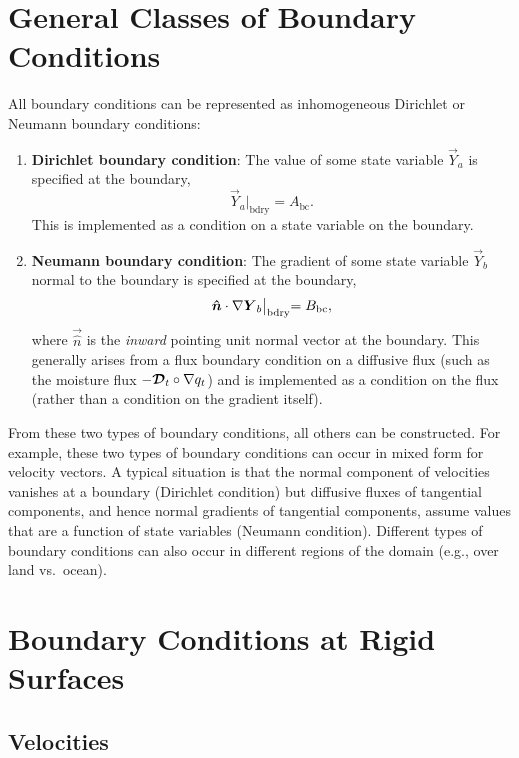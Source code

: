 \documentclass{report}
\begin{document}
\section{General Classes of Boundary Conditions}

All boundary conditions can be represented as inhomogeneous Dirichlet or Neumann boundary conditions:
\begin{enumerate}
    \item \textbf{Dirichlet boundary condition}: The value of some state variable $\vec{Y}_a$ is specified at the boundary,
    \[
    \vec{Y}_a\bigl|_\mathrm{bdry} = A_\mathrm{bc}.
    \]
    This is implemented as a condition on a state variable on the boundary. 
    \item \textbf{Neumann boundary condition}: The gradient of some state variable $\vec{Y}_b$ normal to the boundary is specified at the boundary,
    \[
    \boldsymbol{{\hat n}} \cdot \nabla\boldsymbol{{Y}}_b\bigl|_\mathrm{bdry} = B_\mathrm{bc},
    \] 
    where $\vec{\hat n}$ is the \emph{inward} pointing unit normal vector at the boundary. This generally arises from a flux boundary condition on a diffusive flux (such as the moisture flux $-\boldsymbol{{\mathcal{D}}}_t \circ \nabla q_t$) and is implemented as a condition on the flux (rather than a condition on the gradient itself).
\end{enumerate}
From these two types of boundary conditions, all others can be constructed. For example, these two types of boundary conditions can occur in mixed form for velocity vectors. A typical situation is that the normal component of velocities vanishes at a boundary (Dirichlet condition) but diffusive fluxes of tangential components, and hence normal gradients of tangential components, assume values that are a function of state variables (Neumann condition). Different types of boundary conditions can also occur in different regions of the domain (e.g., over land vs.\ ocean).

\section{Boundary Conditions at Rigid Surfaces}

\subsection{Velocities}
\end{document}
